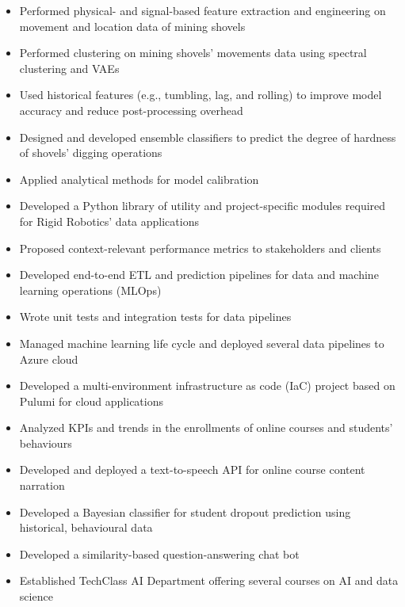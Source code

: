 \documentclass[11pt,a4paper,ragged2e]{altacv}
\begin{document}
\begin{itemize}\setlength\itemsep{0.55em}
\item Performed physical- and signal-based feature extraction and engineering on movement and location data of mining shovels
\item Performed clustering on mining shovels' movements data using spectral clustering and VAEs
\item Used historical features (e.g., tumbling, lag, and rolling) to improve model accuracy and reduce post-processing overhead
\item Designed and developed ensemble classifiers to predict the degree of hardness of shovels' digging operations
\item Applied analytical methods for model calibration
\item Developed a Python library of utility and project-specific modules required for Rigid Robotics' data applications
\item Proposed context-relevant performance metrics to stakeholders and clients
\item Developed end-to-end ETL and prediction pipelines for data and machine learning operations (MLOps)
\item Wrote unit tests and integration tests for data pipelines 
\item Managed machine learning life cycle and deployed several data pipelines to Azure cloud
\item Developed a multi-environment infrastructure as code (IaC) project based on Pulumi for cloud applications
\end{itemize}
 
\divider
\vspace{1.5mm}

\begin{itemize}\setlength\itemsep{0.55em}
\item Analyzed KPIs and trends in the enrollments of online courses and students' behaviours
\item Developed and deployed a text-to-speech API for online course content narration
\item Developed a Bayesian classifier for student dropout prediction using historical, behavioural data
\item Developed a similarity-based question-answering chat bot
\item Established TechClass AI Department offering several courses on AI and data science
\end{itemize}
 
\end{document}
